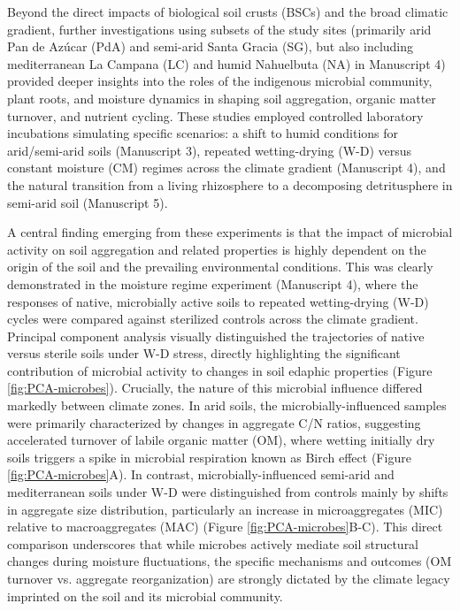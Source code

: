 Beyond the direct impacts of biological soil crusts (BSCs) and the broad climatic gradient, further investigations using subsets of the study sites (primarily arid Pan de Azúcar (PdA) and semi-arid Santa Gracia (SG), but also including mediterranean La Campana (LC) and humid Nahuelbuta (NA) in Manuscript 4) provided deeper insights into the roles of the indigenous microbial community, plant roots, and moisture dynamics in shaping soil aggregation, organic matter turnover, and nutrient cycling. These studies employed controlled laboratory incubations simulating specific scenarios: a shift to humid conditions for arid/semi-arid soils (Manuscript 3), repeated wetting-drying (W-D) versus constant moisture (CM) regimes across the climate gradient (Manuscript 4), and the natural transition from a living rhizosphere to a decomposing detritusphere in semi-arid soil (Manuscript 5).

A central finding emerging from these experiments is that the impact of microbial activity on soil aggregation and related properties is highly dependent on the origin of the soil and the prevailing environmental conditions. This was clearly demonstrated in the moisture regime experiment (Manuscript 4), where the responses of native, microbially active soils to repeated wetting-drying (W-D) cycles were compared against sterilized controls across the climate gradient. Principal component analysis visually distinguished the trajectories of native versus sterile soils under W-D stress, directly highlighting the significant contribution of microbial activity to changes in soil edaphic properties (Figure \ref{fig:PCA-microbes}). Crucially, the nature of this microbial influence differed markedly between climate zones. In arid soils, the microbially-influenced samples were primarily characterized by changes in aggregate C/N ratios, suggesting accelerated turnover of labile organic matter (OM), where wetting initially dry soils triggers a spike in microbial respiration known as Birch effect \citep{Birch1958} (Figure \ref{fig:PCA-microbes}A). In contrast, microbially-influenced semi-arid and mediterranean soils under W-D were distinguished from controls mainly by shifts in aggregate size distribution, particularly an increase in microaggregates (MIC) relative to macroaggregates (MAC) (Figure \ref{fig:PCA-microbes}B-C). This direct comparison underscores that while microbes actively mediate soil structural changes during moisture fluctuations, the specific mechanisms and outcomes (OM turnover vs. aggregate reorganization) are strongly dictated by the climate legacy imprinted on the soil and its microbial community.

